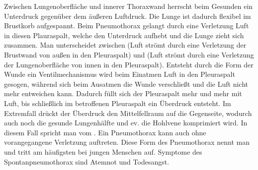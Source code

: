 Zwischen Lungenoberfläche und innerer Thoraxwand herrscht
beim Gesunden ein Unterdruck gegenüber dem äußeren Luftdruck.
Die Lunge ist dadurch flexibel im Brustkorb aufgespannt. Beim
Pneumothorax gelangt durch eine Verletzung Luft in diesen
Plauraspalt, welche den Unterdruck aufhebt und die Lunge
zieht sich zusammen. Man unterscheidet zwischen  (Luft strömt durch eine Verletzung der
Brustwand von außen in den Pleuraspalt) und
 (Luft strömt durch eine
Verletzung der Lungenoberfläche von innen in den
Pleuraspalt). Entsteht durch die Form der Wunde ein
Ventilmechanismus wird beim Einatmen Luft in den Pleuraspalt
gesogen, während sich beim Ausatmen die Wunde verschließt und
die Luft nicht mehr entweichen kann. Dadurch füllt sich der
Pleuraspalt mehr und mehr mit Luft, bis schließlich im
betroffenen Pleuraspalt ein Überdruck entsteht. Im Extremfall
drückt der Überdruck den Mittelfellraum auf die Gegenseite,
wodurch auch noch die gesunde Lungenhälfte und ev. die
Hohlvene komprimiert wird. In diesem Fall spricht man vom
.
Ein Pneumothorax kann auch ohne vorangegangene Verletzung auftreten. Diese Form des
Pneumothorax nennt man  und tritt
am häufigsten bei jungen Menschen auf. Symptome des
Spontanpneumothorax sind Atemnot und Todesangst.






